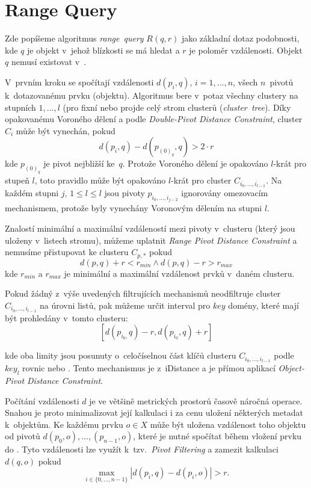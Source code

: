 \section{Range Query\label{sec:Range-Query}}

Zde popíšeme algoritmus \emph{range~query} $R(q,r)$ jako základní dotaz podobnosti, kde $q$ je objekt v~jehož blízkosti se má hledat a $r$ je poloměr vzdálenosti. Objekt $q$ nemusí existovat v~. 


V~prvním kroku se spočítají vzdálenosti $d(p_{i},q),\, i=1,\ldots,n$,
všech $n$~pivotů k~dotazovanému prvku (objektu)\@. Algoritmus
bere v~potaz všechny clustery na stupních $1,\ldots,l$ (pro fixní
\MIndex{} nebo projde celý strom clusterů (\emph{cluster~tree})\@.
Díky opakovanému Voroného dělení a podle \emph{Double-Pivot Distance
Constraint}\cite{similaritysearch2006}, cluster $C_{i}$ může být
vynechán, pokud
\[
d(p_{i},q)-d(p_{(0)_{q}},q)>2\cdot r
\]
kde $p_{(0)_{q}}$ je pivot nejbližší ke~$q$\@. Protože Voroného
dělení je opakováno $l$-krát pro stupeň $l$, toto pravidlo může
být opakováno $l$-krát pro cluster $C_{i_{0},\ldots,i_{l-1}}$\@.
Na každém stupni $j,\,1\leq l\leq l$ jsou pivoty $p_{i_{0},\ldots,i_{j-2}}$
ignorovány omezovacím mechanismem, protože byly vynechány Voronovým
dělením na stupni $l$\@.

Znalostí minimální a maximální vzdáleností mezi pivoty v~clusteru
(který jsou uloženy v~listech stromu), můžeme uplatnit \emph{Range Pivot
Distance Constraint}\cite{similaritysearch2006} a nemusíme přistupovat
ke clusteru $C_{p,*}$ pokud
\[
d(p,q)+r<r_{min} \wedge d(p,q)-r>r_{max}
\]
kde $r_{min}$ a $r_{max}$ je minimální a maximální vzdálenost prvků
v~daném clusteru\@.

Pokud žádný z~výše uvedených filtrujících mechanismů neodfiltruje
cluster $C_{i_{0},\ldots,i_{l-1}}$ na úrovni listů, pak můžeme určit
interval pro $key$ domény, které mají být prohledány v~tomto clusteru:
\[
[d(p_{i_{0},}q)-r,d(p_{i_{0}},q)+r]
\]

kde oba limity jsou posunuty o~celočíselnou část klíčů clusteru $C_{i_{0},\ldots,i_{l-1}}$ podle
$key_{l}$ rovnic  nebo .
Tento mechanismus je  \linebreak z~iDistance a je přímou aplikací
\emph{Object-Pivot Distance Constraint}\cite{similaritysearch2006}.

Počítání vzdálenosti $d$ je ve většině metrických prostorů časově náročná operace.
Snahou je proto minimalizovat její kalkulaci i za cenu uložení některých metadat k~objektům.
Ke každému prvku  $o\in X$ může být uložena vzdálenost toho objektu od pivotů $d(p_0,o),\ldots,(p_{n-1},o)$, které je nutné  spočítat během vložení prvku do .
Tyto vzdálenosti lze využít k~tzv.~\emph{Pivot Filtering}\cite{similaritysearch2006} a zamezit kalkulaci $d(q,o)$ pokud
\[
\max_{i \in \{0,\ldots,n-1\}} |d(p_i,q)-d(p_i,o)| > r.
\]

